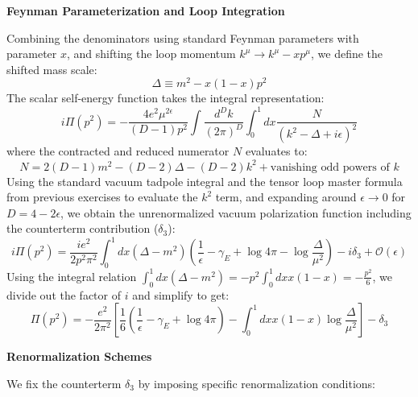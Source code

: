 \textbf{Feynman Parameterization and Loop Integration}

Combining the denominators using standard Feynman parameters with parameter $x$, and shifting the loop momentum $k^\mu \to k^\mu - x p^\mu$, we define the shifted mass scale:
\[
    \Delta \equiv m^2 - x(1-x)p^2
\]
The scalar self-energy function takes the integral representation:
\[
    i\Pi(p^2) = -\frac{4e^2 \mu^{2\epsilon}}{(D-1)p^2} \int \frac{d^D k}{(2\pi)^D} \int_0^1 dx \frac{N}{(k^2 - \Delta + i\epsilon)^2}
\]
where the contracted and reduced numerator $N$ evaluates to:
\[
    N = 2(D-1)m^2 - (D-2)\Delta - (D-2)k^2 + \text{vanishing odd powers of } k
\]
Using the standard vacuum tadpole integral and the tensor loop master formula from previous exercises to evaluate the $k^2$ term, and expanding around $\epsilon \to 0$ for $D = 4 - 2\epsilon$, we obtain the unrenormalized vacuum polarization function including the counterterm contribution ($\delta_3$):
\[
    i\Pi(p^2) = \frac{ie^2}{2p^2\pi^2} \int_0^1 dx (\Delta - m^2) \left( \frac{1}{\epsilon} - \gamma_E + \log 4\pi - \log \frac{\Delta}{\mu^2} \right) - i\delta_3 + \mathcal{O}(\epsilon)
\]
Using the integral relation $\int_0^1 dx (\Delta - m^2) = -p^2 \int_0^1 dx x(1-x) = -\frac{p^2}{6}$, we divide out the factor of $i$ and simplify to get:
\[
    \Pi(p^2) = -\frac{e^2}{2\pi^2} \left[ \frac{1}{6} \left( \frac{1}{\epsilon} - \gamma_E + \log 4\pi \right) - \int_0^1 dx x(1-x) \log \frac{\Delta}{\mu^2} \right] - \delta_3
\]

\textbf{Renormalization Schemes}

We fix the counterterm $\delta_3$ by imposing specific renormalization conditions:

